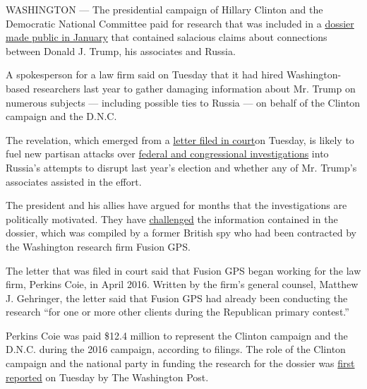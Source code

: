 WASHINGTON --- The presidential campaign of Hillary Clinton and the
Democratic National Committee paid for research that was included in a
\href{https://www.nytimes.com/2017/01/11/us/politics/donald-trump-russia-intelligence.html}{dossier
made public in January} that contained salacious claims about
connections between Donald J. Trump, his associates and Russia.

A spokesperson for a law firm said on Tuesday that it had hired
Washington-based researchers last year to gather damaging information
about Mr. Trump on numerous subjects --- including possible ties to
Russia --- on behalf of the Clinton campaign and the D.N.C.

The revelation, which emerged from a
\href{https://www.documentcloud.org/documents/4116755-PerkinsCoie-Fusion-PrivelegeLetter-102417.html}{letter
filed in court}on Tuesday, is likely to fuel new partisan attacks over
\href{https://www.nytimes.com/2017/10/22/us/politics/russia-investigation-congress-intelligence-committees-gowdy.html}{federal
and congressional investigations} into Russia's attempts to disrupt last
year's election and whether any of Mr. Trump's associates assisted in
the effort.

The president and his allies have argued for months that the
investigations are politically motivated. They have
\href{https://www.nytimes.com/2017/08/30/us/politics/trump-russia-michael-cohen.html}{challenged}
the information contained in the dossier, which was compiled by a former
British spy who had been contracted by the Washington research firm
Fusion GPS.

The letter that was filed in court said that Fusion GPS began working
for the law firm, Perkins Coie, in April 2016. Written by the firm's
general counsel, Matthew J. Gehringer, the letter said that Fusion GPS
had already been conducting the research ``for one or more other clients
during the Republican primary contest.''

Perkins Coie was paid \$12.4 million to represent the Clinton campaign
and the D.N.C. during the 2016 campaign, according to filings. The role
of the Clinton campaign and the national party in funding the research
for the dossier was
\href{https://www.washingtonpost.com/world/national-security/clinton-campaign-dnc-paid-for-research-that-led-to-russia-dossier/2017/10/24/226fabf0-b8e4-11e7-a908-a3470754bbb9_story.html?source=gmail\&usg=AFQjCNH3gY97gLgf21UAC5-BLneZPH2Xxw\&ust=1508970556887000\&utm_term=.73eac5184d14\&utm_term\%3D.50f695ff5f0c}{first
reported} on Tuesday by The Washington Post.

